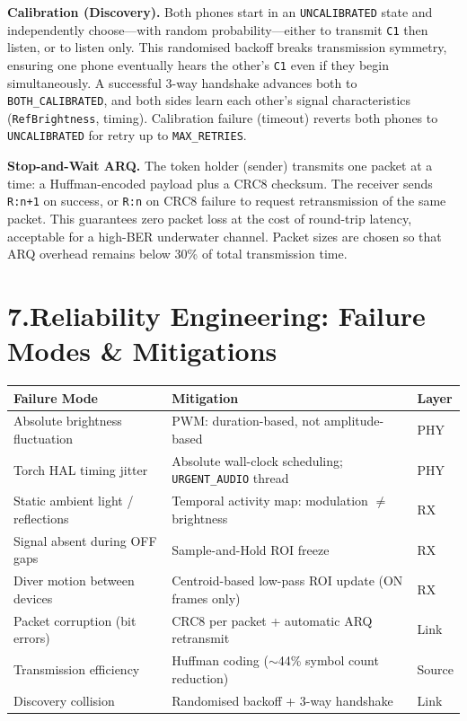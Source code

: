 \documentclass[10pt,a4paper]{article}
\begin{document}
\textbf{Calibration (Discovery).}
Both phones start in an \texttt{UNCALIBRATED} state and independently choose---with random
probability---either to transmit \texttt{C1} then listen, or to listen only.
This randomised backoff breaks transmission symmetry, ensuring one phone eventually
hears the other's \texttt{C1} even if they begin simultaneously.
A successful 3-way handshake advances both to \texttt{BOTH\_CALIBRATED}, and both sides
learn each other's signal characteristics (\texttt{RefBrightness}, timing).
Calibration failure (timeout) reverts both phones to \texttt{UNCALIBRATED} for retry
up to \texttt{MAX\_RETRIES}.

\textbf{Stop-and-Wait ARQ.}
The token holder (sender) transmits one packet at a time: a Huffman-encoded payload
plus a CRC8 checksum.
The receiver sends \texttt{R:n+1} on success, or \texttt{R:n} on CRC8 failure to request
retransmission of the same packet.
This guarantees zero packet loss at the cost of round-trip latency, acceptable for a
high-BER underwater channel.
Packet sizes are chosen so that ARQ overhead remains below 30\% of total
transmission time.

\section{7.\enspace Reliability Engineering: Failure Modes \& Mitigations}

\begin{center}\small\setlength{\tabcolsep}{8pt}
\begin{tabular}{lll}
\toprule
\textbf{Failure Mode} & \textbf{Mitigation} & \textbf{Layer} \\
\midrule
Absolute brightness fluctuation & PWM: duration-based, not amplitude-based & PHY \\
Torch HAL timing jitter & Absolute wall-clock scheduling; \texttt{URGENT\_AUDIO} thread & PHY \\
Static ambient light / reflections & Temporal activity map: modulation $\neq$ brightness & RX \\
Signal absent during OFF gaps & Sample-and-Hold ROI freeze & RX \\
Diver motion between devices & Centroid-based low-pass ROI update (ON frames only) & RX \\
Packet corruption (bit errors) & CRC8 per packet + automatic ARQ retransmit & Link \\
Transmission efficiency & Huffman coding ($\sim$44\% symbol count reduction) & Source \\
Discovery collision & Randomised backoff + 3-way handshake & Link \\
\bottomrule
\end{tabular}
\end{center}
\end{document}
